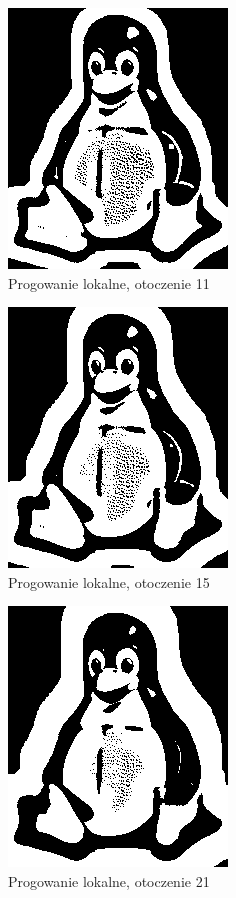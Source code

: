 \documentclass[12pt, a4paper]{article}
\begin{document}
\begin{figure}[p]
\includegraphics{local_11}
\caption{Progowanie lokalne, otoczenie 11}
\label{fig:local_11}
\end{figure}
\begin{figure}[p]
\includegraphics{local_15}
\caption{Progowanie lokalne, otoczenie 15}
\label{fig:local_15}
\end{figure}
\begin{figure}[p]
\includegraphics{local_21}
\caption{Progowanie lokalne, otoczenie 21}
\label{fig:local_21}
\end{figure}
\end{document}
